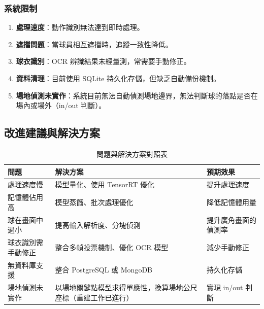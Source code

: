 \documentclass[a4paper,14pt,oneside]{article}
\begin{document}
\subsubsection{系統限制}
\begin{enumerate}
    \item \textbf{處理速度}：動作識別無法達到即時處理。
    
    \item \textbf{遮擋問題}：當球員相互遮擋時，追蹤一致性降低。
    
    \item \textbf{球衣識別}：OCR 辨識結果未經量測，常需要手動修正。
    
    \item \textbf{資料清理}：目前使用 SQLite 持久化存儲，但缺乏自動備份機制。
    
    \item \textbf{場地偵測未實作}：系統目前無法自動偵測場地邊界，無法判斷球的落點是否在場內或場外（in/out 判斷）。
\end{enumerate}

\subsection{改進建議與解決方案}

\begin{table}[H]
    \centering
    \caption{問題與解決方案對照表}
    \begin{tabular}{|p{4cm}|p{5cm}|p{4cm}|}
        \hline
        \textbf{問題} & \textbf{解決方案} & \textbf{預期效果} \\
        \hline
        處理速度慢 & 模型量化、使用 TensorRT 優化 & 提升處理速度 \\
        \hline
        記憶體佔用高 & 模型蒸餾、批次處理優化 & 降低記憶體用量 \\
        \hline
        球在畫面中過小 & 提高輸入解析度、分塊偵測 & 提升廣角畫面的偵測率 \\
        \hline
        球衣識別需手動修正 & 整合多幀投票機制、優化 OCR 模型 & 減少手動修正 \\
        \hline
        無資料庫支援 & 整合 PostgreSQL 或 MongoDB & 持久化存儲 \\
        \hline
        場地偵測未實作 & 以場地關鍵點模型求得單應性，換算場地公尺座標（重建工作已進行） & 實現 in/out 判斷 \\
        \hline
    \end{tabular}
\end{table}
\end{document}
